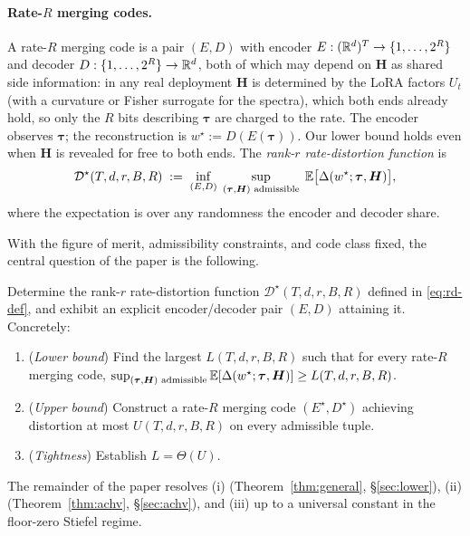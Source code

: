 \paragraph{Rate-$R$ merging codes.} A rate-$R$ merging code is a
pair $(E, D)$ with encoder $E : (\mathbb{R}^d)^T \to \{1,\ldots,2^R\}$
and decoder $D : \{1,\ldots,2^R\}\to\mathbb{R}^d$, both of which may
depend on $\boldsymbol H$ as shared side information: in any real
deployment $\boldsymbol H$ is determined by the LoRA factors
$U_t$ (with a curvature or Fisher surrogate for the spectra),
which both ends already hold, so only the $R$ bits describing
$\boldsymbol\tau$ are charged to the rate. The encoder observes
$\boldsymbol\tau$; the reconstruction is $w^\star :=
D(E(\boldsymbol\tau))$. Our lower bound holds even when
$\boldsymbol H$ is revealed for free to both ends. The \emph{rank-$r$
rate-distortion function} is
\begin{equation}\label{eq:rd-def}
  \mathcal{D}^\star(T, d, r, B, R)
  \;:=\; \inf_{(E, D)}\;\sup_{(\boldsymbol\tau, \boldsymbol H)
    \text{ admissible}}\;
  \mathbb{E}\bigl[\Delta(w^\star;\boldsymbol\tau, \boldsymbol H)\bigr],
\end{equation}
where the expectation is over any randomness the encoder and
decoder share.

With the figure of merit, admissibility constraints, and code
class fixed, the central question of the paper is the following.

\begin{problem}
\label{prob:merging}
Determine the rank-$r$ rate-distortion function
$\mathcal{D}^\star(T, d, r, B, R)$ defined in
\eqref{eq:rd-def}, and exhibit an explicit encoder/decoder pair
$(E, D)$ attaining it. Concretely:
\begin{enumerate}[leftmargin=*,topsep=2pt,itemsep=0pt]
  \item (\emph{Lower bound}) Find the largest $L(T, d, r, B, R)$
  such that for every rate-$R$ merging code,
  $\sup_{(\boldsymbol\tau,\boldsymbol H)\text{ admissible}}
  \mathbb{E}[\Delta(w^\star;\boldsymbol\tau,\boldsymbol H)]\geq
  L(T, d, r, B, R)$.
  \item (\emph{Upper bound}) Construct a rate-$R$ merging code
  $(E^\star, D^\star)$ achieving distortion at most
  $U(T, d, r, B, R)$ on every admissible tuple.
  \item (\emph{Tightness}) Establish $L = \Theta(U)$.
\end{enumerate}
The remainder of the paper resolves (i)
(Theorem~\ref{thm:general}, \S\ref{sec:lower}), (ii)
(Theorem~\ref{thm:achv}, \S\ref{sec:achv}), and (iii) up to a
universal constant in the floor-zero Stiefel regime.
\end{problem}

